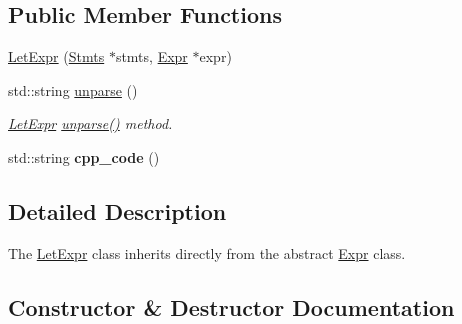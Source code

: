 \subsection*{Public Member Functions}
\begin{DoxyCompactItemize}
\item 
\hyperlink{classfcal_1_1ast_1_1LetExpr_ab74edb2ea044f4a53e3aaf07ba3e692a}{Let\+Expr} (\hyperlink{classfcal_1_1ast_1_1Stmts}{Stmts} $\ast$stmts, \hyperlink{classfcal_1_1ast_1_1Expr}{Expr} $\ast$expr)
\item 
std\+::string \hyperlink{classfcal_1_1ast_1_1LetExpr_a5277bbe3510e870f65dd9158592ef6da}{unparse} ()
\begin{DoxyCompactList}\small\item\em \hyperlink{classfcal_1_1ast_1_1LetExpr}{Let\+Expr} \hyperlink{classfcal_1_1ast_1_1LetExpr_a5277bbe3510e870f65dd9158592ef6da}{unparse()} method. \end{DoxyCompactList}\item 
std\+::string {\bfseries cpp\+\_\+code} ()\hypertarget{classfcal_1_1ast_1_1LetExpr_a960972260e0f70e3baa79b10d5c0d8ce}{}\label{classfcal_1_1ast_1_1LetExpr_a960972260e0f70e3baa79b10d5c0d8ce}

\end{DoxyCompactItemize}


\subsection{Detailed Description}
The \hyperlink{classfcal_1_1ast_1_1LetExpr}{Let\+Expr} class inherits directly from the abstract \hyperlink{classfcal_1_1ast_1_1Expr}{Expr} class. 

\subsection{Constructor \& Destructor Documentation}
